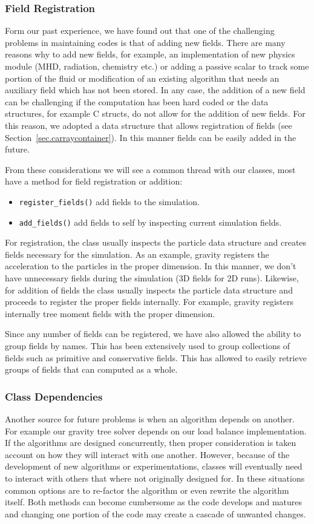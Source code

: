 \subsubsection{Field Registration}
Form our past experience, we have found out that one of the challenging problems in maintaining codes
is that of adding new fields. There are many reasons why to add new fields, for example,
an implementation of new physics module (MHD, radiation, chemistry etc.) or adding a passive scalar
to track some portion of the fluid or modification of an existing algorithm that needs an auxiliary
field which has not been stored. In any case, the addition of a new field can be challenging
if the computation has been hard coded or the data structures, for example C structs, do not
allow for the addition of new fields. For this reason, we adopted a data structure
that allows registration of fields (see Section~\ref{sec.carraycontainer}). In this manner
fields can be easily added in the future.

From these considerations we will see a common thread with our classes, most have a method
for field registration or addition:
\begin{itemize}
	\item \lstinline{register_fields()} add fields to the simulation.
    \item \lstinline{add_fields()} add fields to self by inspecting current simulation fields.
\end{itemize}
For registration, the class usually inspects the particle data structure and creates fields
necessary for the simulation. As an example, gravity registers the acceleration to the particles
in the proper dimension. In this manner, we don't have unnecessary fields during the simulation
(3D fields for 2D runs). Likewise, for addition of fields the class usually inspects the
particle data structure and proceeds to register the proper fields internally. For example, gravity 
registers internally tree moment fields with the proper dimension.

Since any number of fields can be registered, we have also allowed the ability to group
fields by names. This has been extensively used to group collections of fields such as
primitive and conservative fields. This has allowed to easily retrieve groups of fields
that can computed as a whole.

\subsubsection{Class Dependencies}
Another source for future problems is when an algorithm depends on another. For example
our gravity tree solver depends on our load balance implementation. If the algorithms
are designed concurrently, then proper consideration is taken account on how they will
interact with one another. However, because of the development of new algorithms or experimentations, 
classes will eventually need to interact with others that where not originally designed for. In these
situations common options are to re-factor the algorithm or even rewrite the algorithm itself. Both 
methods can become cumbersome as the code develops and matures and changing one portion of the code 
may create a cascade of unwanted changes.

